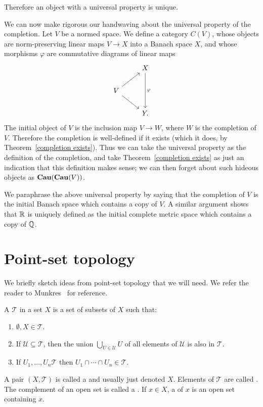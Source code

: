 \begin{subsec}
Therefore an object with a universal property is unique.
\end{subsec}

\begin{subsec}
We can now make rigorous our handwaving about the universal property of the completion.
Let $V$ be a normed space. We define a category $C(V)$, whose objects are norm-preserving linear maps $V \to X$ into a Banach space $X$, and whose morphisms $\varphi$ are commutative diagrams of linear maps
\[\begin{tikzcd}&X \arrow[dd,"\varphi"]\\
V \arrow[ur] \arrow[dr]\\
&Y.\end{tikzcd}
\]
The initial object of $V$ is the inclusion map $V \to W$, where $W$ is the completion of $V$.
Therefore the completion is well-defined if it exists (which it does, by Theorem~\ref{completion exists}).
Thus we can take the universal property as the definition of the completion, and take Theorem~\ref{completion exists} as just an indication that this definition makes sense; we can then forget about such hideous objects as $\mathbf{Cau}(\mathbf{Cau}(V))$.
\end{subsec}

\begin{subsec}
We paraphrase the above universal property by saying that the completion of $V$ is the initial Banach space which contains a copy of $V$.
A similar argument shows that $\mathbb{R}$ is uniquely defined as the initial complete metric space which contains a copy of $\mathbb{Q}$.
\end{subsec}

\section{Point-set topology}
We briefly sketch ideas from point-set topology that we will need.
We refer the reader to Munkres~\cite{munkres2000topology} for reference.

\begin{definition}
A  $\mathcal T$ in a set $X$ is a set of subsets of $X$ such that:
\begin{enumerate}
\item $\emptyset, X \in \mathcal T$.
\item If $\mathcal U \subseteq \mathcal T$, then the union $\bigcup_{U \in \mathcal U} U$ of all elements of $\mathcal U$ is also in $\mathcal T$.
\item If $U_{1}, \dots, U_{n} \mathcal T$ then $U_{1} \cap \cdots \cap U_{n} \in \mathcal T$.
\end{enumerate}
A pair $(X, \mathcal T)$ is called a  and usually just denoted $X$.
Elements of $\mathcal T$ are called .
The complement of an open set is called a .
If $x \in X$, a  of $x$ is an open set containing $x$.
\end{definition}


